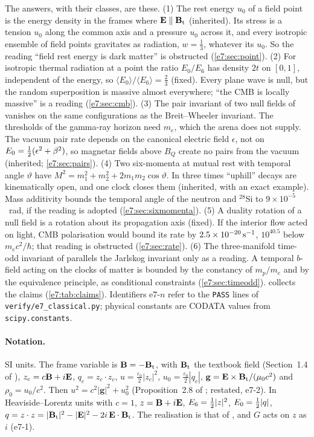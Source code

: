 The answers, with their classes, are these. (1) The rest energy $u_0$ of a field point is the energy density in the frames where $\mathbf E\parallel\mathbf B_{\rm t}$
(inherited). Its stress is a tension $u_0$ along the common axis and a pressure $u_0$ across it, and every isotropic ensemble of field points
gravitates as radiation, $w=\tfrac13$, whatever its $u_0$. So the reading ``field rest energy is dark matter'' is obstructed
(\cref{e7:sec:point}). (2) For isotropic thermal radiation at a point the ratio $E_0/E_6$ has density $2t$ on $[0,1]$, independent of the
energy, so $\langle E_0\rangle/\langle E_6\rangle=\tfrac23$ (fixed). Every plane wave is null, but the random superposition is massive almost
everywhere; ``the CMB is locally massive'' is a reading (\cref{e7:sec:cmb}). (3) The pair invariant of two null fields of \cite{RE} vanishes
on the same configurations as the Breit--Wheeler invariant. The thresholds of the gamma-ray horizon need $m_e$, which the arena does not
supply. The vacuum pair rate depends on the canonical electric field $\epsilon$, not on $E_0=\tfrac12(\epsilon^2+\beta^2)$, so magnetar fields above
$B_Q$ create no pairs from the vacuum (inherited; \cref{e7:sec:pairs}). (4) Two six-momenta at mutual rest with temporal angle $\vartheta$ have
$M^2=m_1^2+m_2^2+2m_1m_2\cos\vartheta$. In three times ``uphill'' decays are kinematically open, and one clock closes them (inherited, with an
exact example). Mass additivity bounds the temporal angle of the neutron and $^{28}$Si to $9\times10^{-5}$~rad, if the reading is adopted
(\cref{e7:sec:sixmomenta}). (5) A duality rotation of a null field is a rotation about its propagation axis (fixed). If the interior flow acted
on light, CMB polarisation would bound its rate by $2.5\times10^{-20}\,{\rm s^{-1}}$, $10^{40.5}$ below $m_ec^2/\hbar$; that reading is
obstructed (\cref{e7:sec:rate}). (6) The three-manifold time-odd invariant of \cite{RE} parallels the Jarlskog invariant only as a reading. A
temporal $b$-field acting on the clocks of matter is bounded by the constancy of $m_p/m_e$ and by the equivalence principle, as conditional
constraints (\cref{e7:sec:timeodd}).  collects the claims (\cref{e7:tab:claims}). Identifiers e7-$n$ refer to the
\texttt{PASS} lines of \texttt{verify/e7\_classical.py}; physical constants are CODATA values from \texttt{scipy.constants}.

\paragraph{Notation.} SI units. The frame variable is $\mathbf B=-\mathbf B_{\rm t}$, with $\mathbf B_{\rm t}$ the textbook field (Section~1.4 of \cite{ES17}), $z_c=c\mathbf B+i\mathbf E$,
$q_c=z_c\cdot z_c$, $u=\tfrac{\varepsilon_0}2|z_c|^2$, $u_0=\tfrac{\varepsilon_0}2|q_c|$, $\mathbf g=\mathbf E\times\mathbf B_{\rm t}/(\mu_0c^2)$ and $\rho_0=u_0/c^2$. Then
$u^2=c^2|\mathbf g|^2+u_0^2$ (Proposition~2.8 of \cite{RE}; restated, e7-2). In Heaviside--Lorentz units with $c=1$, $z=\mathbf B+i\mathbf E$, $E_6=\tfrac12|z|^2$,
$E_0=\tfrac12|q|$, $q=z\cdot z=|\mathbf B_{\rm t}|^2-|\mathbf E|^2-2i\,\mathbf E\cdot\mathbf B_{\rm t}$. The realisation is that of \cite{ES17}, and $G$ acts on $z$ as $i$ (e7-1).

